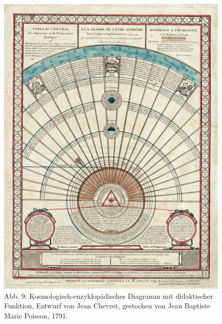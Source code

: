 \begin{figure}[htbp]
\centering
\includegraphics{img/wagner-9.jpg}
\caption{Abb. 9: Kosmologisch-enzyklopädisches Diagramm mit didaktischer
Funktion, Entwurf von Jean Chevret, gestochen von Jean Baptiste Marie
Poisson, 1791.}
\end{figure}

